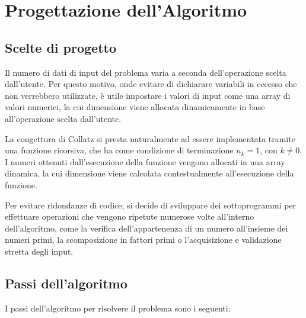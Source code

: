 \documentclass{article}
\begin{document}
\newpage


\section{Progettazione dell'Algoritmo}

\subsection{Scelte di progetto}
Il numero di dati di input del problema varia a seconda dell'operazione scelta dall'utente. Per questo motivo, onde evitare di dichiarare variabili in eccesso che
non verrebbero utilizzate, è utile impostare i valori di input come una array di valori numerici, la cui dimensione viene allocata dinamicamente in base all'operazione
scelta dall'utente.

La congettura di Collatz si presta naturalmente ad essere implementata tramite una funzione ricorsiva, che ha come condizione di terminazione $n_k = 1$, con $k\ne0$.
I numeri ottenuti dall'esecuzione della funzione vengono allocati in una array dinamica, la cui dimensione viene calcolata contestualmente all'esecuzione della funzione.

Per evitare ridondanze di codice, si decide di sviluppare dei sottoprogrammi per effettuare operazioni che vengono ripetute numerose volte all'interno dell'algoritmo, come
la verifica dell'appartenenza di un numero all'insieme dei numeri primi, la scomposizione in fattori primi o l'acquisizione e validazione stretta degli input.


\subsection{Passi dell'algoritmo}
I passi dell'algoritmo per risolvere il problema sono i seguenti:
\end{document}
